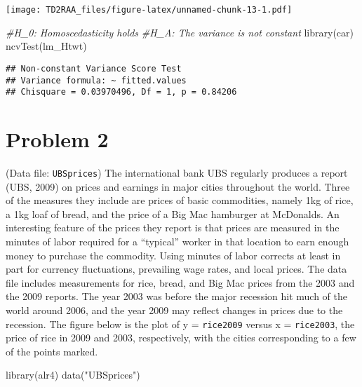 \documentclass[
]{article}
\newenvironment{Shaded}{\begin{snugshade}}{\end{snugshade}}
\newcommand{\CommentTok}[1]{\textcolor[rgb]{0.56,0.35,0.01}{\textit{#1}}}
\newcommand{\FunctionTok}[1]{\textcolor[rgb]{0.00,0.00,0.00}{#1}}
\newcommand{\NormalTok}[1]{#1}
\newcommand{\StringTok}[1]{\textcolor[rgb]{0.31,0.60,0.02}{#1}}
\begin{document}
\texttt{[image: TD2RAA\_files/figure-latex/unnamed-chunk-13-1.pdf]}

\begin{Shaded}
\begin{Highlighting}[]
\CommentTok{\#H\_0: Homoscedasticity holds}
\CommentTok{\#H\_A: The variance is not constant}
\FunctionTok{library}\NormalTok{(car)}
\FunctionTok{ncvTest}\NormalTok{(lm\_Htwt)}
\end{Highlighting}
\end{Shaded}

\begin{verbatim}
## Non-constant Variance Score Test 
## Variance formula: ~ fitted.values 
## Chisquare = 0.03970496, Df = 1, p = 0.84206
\end{verbatim}

\hypertarget{problem-2}{%
\section{Problem 2}\label{problem-2}}

(Data file: \texttt{UBSprices}) The international bank UBS regularly
produces a report (UBS, 2009) on prices and earnings in major cities
throughout the world. Three of the measures they include are prices of
basic commodities, namely 1kg of rice, a 1kg loaf of bread, and the
price of a Big Mac hamburger at McDonalds. An interesting feature of the
prices they report is that prices are measured in the minutes of labor
required for a ``typical'' worker in that location to earn enough money
to purchase the commodity. Using minutes of labor corrects at least in
part for currency fluctuations, prevailing wage rates, and local prices.
The data file includes measurements for rice, bread, and Big Mac prices
from the 2003 and the 2009 reports. The year 2003 was before the major
recession hit much of the world around 2006, and the year 2009 may
reflect changes in prices due to the recession. The figure below is the
plot of y = \texttt{rice2009} versus x = \texttt{rice2003}, the price of
rice in 2009 and 2003, respectively, with the cities corresponding to a
few of the points marked.

\begin{Shaded}
\begin{Highlighting}[]
\FunctionTok{library}\NormalTok{(alr4)}
\FunctionTok{data}\NormalTok{(}\StringTok{"UBSprices"}\NormalTok{)}
\end{Highlighting}
\end{Shaded}
\end{document}
